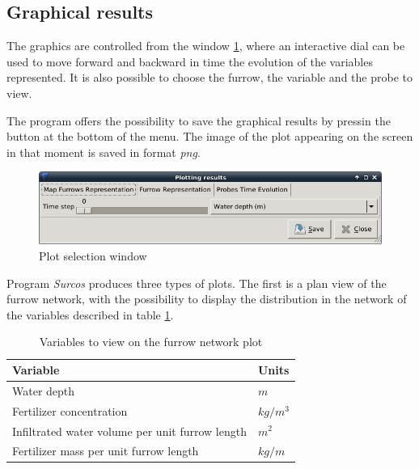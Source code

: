 \subsection{Graphical results}

The graphics are controlled from the window \ref{barraRepres}, where an interactive dial can be used to move forward and backward in time the evolution of the variables represented. It is also possible to choose the furrow, the variable and the probe to view. 

The program offers the possibility to save the graphical results by pressin the button at the bottom of the menu. The image of the plot appearing on the screen in that moment is saved in format \emph{png}.

\begin{figure}[!h]
\begin{center}
\includegraphics*[width=\textwidth]{images/menuRepresEN.png}
\qquad
\caption{Plot selection window}\label{barraRepres}
\end{center}
\end{figure}

Program \emph{Surcos} produces three types of plots. The first is a plan view of the furrow network, with the possibility to display the distribution in the network of the variables described in table \ref{tableVariablesMapa}.

\begin{table}[h]\footnotesize
\begin{center}
\begin{tabular}{ll}
\hline
Variable & Units \\
\hline
Water depth & $m$ \\
Fertilizer concentration & $ kg/m^3 $\\
Infiltrated water volume per unit furrow length & $ m^2 $ \\
Fertilizer mass per unit furrow length & $ kg/m $ \\
\hline
\end{tabular}
\end{center}
  \caption{Variables to view on the furrow network plot}\label{tableVariablesMapa}
\end{table}

